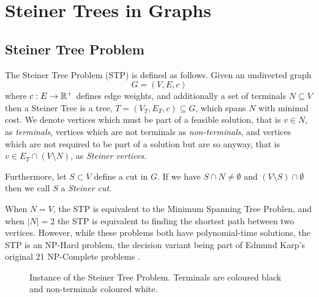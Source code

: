 \chapter{Steiner Trees in Graphs}
\label{chap:steiner-trees}

\section{Steiner Tree Problem}
The Steiner Tree Problem (STP) is defined as follows.
Given an undirected graph
$$G = (V, E, c)$$
 where $c: E \to \mathbb{R}^+$ defines edge weights, and additionally a set of terminals $N \subseteq V$ then
a Steiner Tree is a tree, $T = (V_T, E_T, c) \subseteq G$, which spans $N$ with minimal cost. We denote vertices which must be part of a feasible solution,
that is $v \in N$, as \textit{terminals}, vertices which are not terminals as \textit{non-terminals},
and vertices which are not required to be part of a solution but are so anyway, that is
$v \in E_T \cap (V \setminus N)$, as \textit{Steiner vertices}.

Furthermore, let $S \subset V$ define a cut in $G$. If we have $S \cap N \neq \emptyset$ and $(V \setminus S) \cap \emptyset$ then we
 call $S$ a \textit{Steiner cut}.

When $N = V$, the STP is equivalent to the Minimum Spanning Tree Problen, and when $|N| = 2$ the STP is equivalent to finding the
shortest path between two vertices. However, while these problems both have polynomial-time solutions, the STP is an NP-Hard problem,
 the decision variant being part of Edmund Karp's original 21 NP-Complete problems \citep{karp1972reducibility}.

\begin{figure}[h]\centering
{}
\caption{Instance of the Steiner Tree Problem. Terminals are coloured black and non-terminals coloured white.}
\label{fig:stp:01}
\end{figure}

